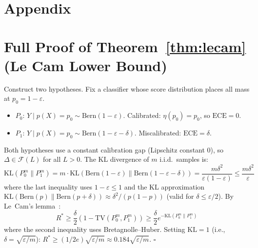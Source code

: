 \documentclass{article}
\newcommand{\ECE}{\mathrm{ECE}}
\newcommand{\cF}{\mathcal{F}}
\newcommand{\Lip}{L}
\newcommand{\errrate}{\varepsilon}
\newcommand{\nsamples}{m}
\newcommand{\calmapraw}{\eta}
\newcommand{\calmap}{\Delta}
\providecommand{\KL}{}
\renewcommand{\KL}{\mathrm{KL}}
\newcommand{\TV}{\mathrm{TV}}
\newcommand{\Bern}{\mathrm{Bern}}
\theoremstyle{definition}
\begin{document}



\newpage
\appendix
\section*{Appendix}

\section{Full Proof of Theorem~\ref{thm:lecam} (Le Cam Lower Bound)}
\label{app:lecam-proof}

Construct two hypotheses. Fix a classifier whose score distribution places all mass at $p_0 = 1 - \errrate$.
\begin{itemize}
    \item $P_0$: $Y \mid p(X) = p_0 \sim \Bern(1 - \errrate)$. Calibrated: $\calmapraw(p_0) = p_0$, so $\ECE = 0$.
    \item $P_1$: $Y \mid p(X) = p_0 \sim \Bern(1 - \errrate - \delta)$. Miscalibrated: $\ECE = \delta$.
\end{itemize}
Both hypotheses use a constant calibration gap (Lipschitz constant 0), so $\calmap \in \cF(\Lip)$ for all $\Lip > 0$. The KL divergence of $\nsamples$ i.i.d.\ samples is:
\[
\KL(P_0^{\nsamples} \| P_1^{\nsamples}) = \nsamples \cdot \KL(\Bern(1-\errrate) \| \Bern(1-\errrate-\delta)) = \frac{\nsamples \delta^2}{\errrate(1-\errrate)} \leq \frac{\nsamples \delta^2}{\errrate}
\]
where the last inequality uses $1 - \errrate \leq 1$ and the KL approximation $\KL(\Bern(p) \| \Bern(p+\delta)) \approx \delta^2 / (p(1-p))$ (valid for $\delta \leq \errrate/2$). By Le~Cam's lemma~\citep{tsybakov2009nonparametric}:
\[
R^* \geq \frac{\delta}{2}\left(1 - \TV(P_0^{\nsamples}, P_1^{\nsamples})\right) \geq \frac{\delta}{2} e^{-\KL(P_0^{\nsamples} \| P_1^{\nsamples})}
\]
where the second inequality uses Bretagnolle--Huber. Setting $\KL = 1$ (i.e., $\delta = \sqrt{\errrate / \nsamples}$): $R^* \geq (1/2e) \sqrt{\errrate/\nsamples} \approx 0.184 \sqrt{\errrate/\nsamples}$. $\square$
\end{document}
